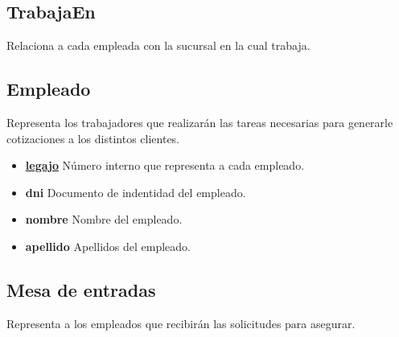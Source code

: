 \documentclass[a4paper,11pt]{article}
\begin{document}
\subsection{TrabajaEn}

Relaciona a cada empleada con la sucursal en la cual trabaja.

\subsection{Empleado}

Representa los trabajadores que realizarán las tareas necesarias para generarle cotizaciones
a los distintos clientes.

\begin{itemize}
   
  \item \textbf{\uline{legajo}} Número interno que representa a cada empleado.
  
  \item \textbf{dni} Documento de indentidad del empleado.
  
  \item \textbf{nombre} Nombre del empleado.
  
  \item \textbf{apellido} Apellidos del empleado.
  
\end{itemize}



   
  
  

\subsection{Mesa de entradas}

Representa a los empleados que recibirán las solicitudes para asegurar.
\end{document}
